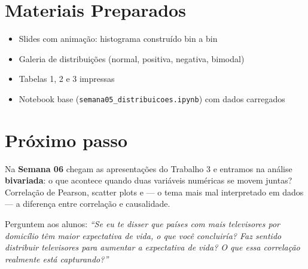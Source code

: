 \section{Materiais Preparados}
\begin{itemize}
  \item Slides com animação: histograma construído bin a bin
  \item Galeria de distribuições (normal, positiva, negativa, bimodal)
  \item Tabelas 1, 2 e 3 impressas
  \item Notebook base (\texttt{semana05\_distribuicoes.ipynb}) com dados carregados
\end{itemize}

\section{Próximo passo}

Na \textbf{Semana 06} chegam as apresentações do Trabalho 3 e entramos
na análise \textbf{bivariada}: o que acontece quando duas variáveis numéricas
se movem juntas? Correlação de Pearson, scatter plots e — o tema mais
mal interpretado em dados — a diferença entre correlação e causalidade.

Perguntem aos alunos: \textit{``Se eu te disser que países com mais
televisores por domicílio têm maior expectativa de vida, o que você
concluiría? Faz sentido distribuir televisores para aumentar a expectativa
de vida? O que essa correlação realmente está capturando?''}

